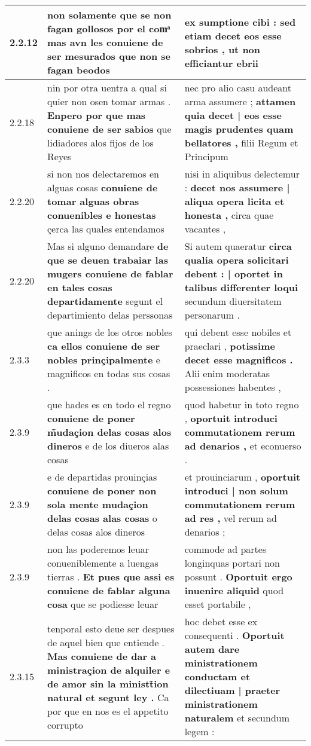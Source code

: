 \begin{tabular}{|p{1cm}|p{6.5cm}|p{6.5cm}|}
2.2.12 & non solamente que se non fagan gollosos por el comͣ \textbf{ mas avn les conuiene de ser mesurados } que non se fagan beodos & ex sumptione cibi : \textbf{ sed etiam decet eos esse sobrios , } ut non efficiantur ebrii \\\hline
2.2.18 & nin por otra uentra a qual si quier non osen tomar armas . \textbf{ Enpero por que mas conuiene de ser sabios } que lidiadores alos fijos de los Reyes & nec pro alio casu audeant arma assumere ; \textbf{ attamen quia decet | eos esse magis prudentes quam bellatores , } filii Regum et Principum \\\hline
2.2.20 & si non nos delectaremos en alguas cosas \textbf{ conuiene de tomar alguas obras conuenibles e honestas } çerca las quales entendamos & nisi in aliquibus delectemur : \textbf{ decet nos assumere | aliqua opera licita et honesta , } circa quae vacantes , \\\hline
2.2.20 & Mas si alguno demandare \textbf{ de que se deuen trabaiar las mugers conuiene de fablar en tales cosas departidamente } segunt el departimiento delas perssonas & Si autem quaeratur \textbf{ circa qualia opera solicitari debent : | oportet in talibus differenter loqui } secundum diuersitatem personarum . \\\hline
2.3.3 & que anings de los otros nobles \textbf{ ca ellos conuiene de ser nobles prinçipalmente } e magnificos en todas sus cosas . & qui debent esse nobiles et praeclari , \textbf{ potissime decet esse magnificos . } Alii enim moderatas possessiones habentes , \\\hline
2.3.9 & que hades es en todo el regno \textbf{ conuiene de poner m̃udaçion delas cosas alos dineros } e de los diueros alas cosas & quod habetur in toto regno , \textbf{ oportuit introduci commutationem rerum ad denarios , } et econuerso . \\\hline
2.3.9 & e de departidas prouinçias \textbf{ conuiene de poner non sola mente mudaçion delas cosas alas cosas } o delas cosas alos dineros & et prouinciarum , \textbf{ oportuit introduci | non solum commutationem rerum ad res , } vel rerum ad denarios ; \\\hline
2.3.9 & non las poderemos leuar conueniblemente a luengas tierras . \textbf{ Et pues que assi es conuiene de fablar alguna cosa } que se podiesse leuar & commode ad partes longinquas portari non possunt . \textbf{ Oportuit ergo inuenire aliquid } quod esset portabile , \\\hline
2.3.15 & tenporal esto deue ser despues de aquel bien que entiende . \textbf{ Mas conuiene de dar a ministraçion de alquiler e de amor sin la ministt̃ion natural et segunt ley . } Ca por que en nos es el appetito corrupto & hoc debet esse ex consequenti . \textbf{ Oportuit autem dare ministrationem conductam et dilectiuam | praeter ministrationem naturalem } et secundum legem : \\\hline

\end{tabular}
